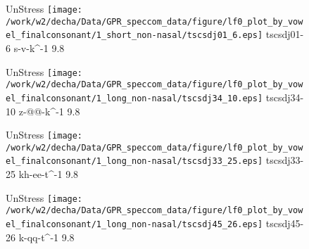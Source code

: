 \documentclass{article}
\begin{document}
\begin{figure}[t]
\begin{minipage}[b]{.24\textwidth}
UnStress
\centering
\texttt{[image: /work/w2/decha/Data/GPR\_speccom\_data/figure/lf0\_plot\_by\_vowel\_finalconsonant/1\_short\_non-nasal/tscsdj01\_6.eps]}
tscsdj01-6 s-v-k\textasciicircum-1 9.8
\end{minipage}
\begin{minipage}[b]{.24\textwidth}
UnStress
\centering
\texttt{[image: /work/w2/decha/Data/GPR\_speccom\_data/figure/lf0\_plot\_by\_vowel\_finalconsonant/1\_long\_non-nasal/tscsdj34\_10.eps]}
tscsdj34-10 z-@@-k\textasciicircum-1 9.8
\end{minipage}
\begin{minipage}[b]{.24\textwidth}
UnStress
\centering
\texttt{[image: /work/w2/decha/Data/GPR\_speccom\_data/figure/lf0\_plot\_by\_vowel\_finalconsonant/1\_long\_non-nasal/tscsdj33\_25.eps]}
tscsdj33-25 kh-ee-t\textasciicircum-1 9.8
\end{minipage}
\begin{minipage}[b]{.24\textwidth}
UnStress
\centering
\texttt{[image: /work/w2/decha/Data/GPR\_speccom\_data/figure/lf0\_plot\_by\_vowel\_finalconsonant/1\_long\_non-nasal/tscsdj45\_26.eps]}
tscsdj45-26 k-qq-t\textasciicircum-1 9.8
\end{minipage}
\end{figure}
\end{document}
